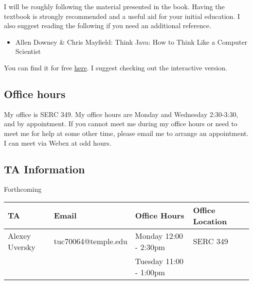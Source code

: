 \documentclass[10pt, letter]{article}
\begin{document}
I will be roughly following the material presented in the book.
Having the textbook is  strongly recommended and a useful aid for your initial education.
I also suggest reading the following if you need an additional reference.

\begin{itemize}
	\item Allen Downey \& Chris Mayfield: Think Java: How to Think Like a Computer Scientist
\end{itemize}

You can find it for free \href{http://greenteapress.com/wp/think-java/}{here}.   I suggest checking out the interactive version.

\subsection*{Office hours}
My office is SERC 349.
My office hours are Monday and Wednesday 2:30-3:30, and by appointment.
If you cannot meet me during my office hours or need to meet me for help at some other time, please email me to arrange an appointment. 
I can meet via Webex at odd hours.


\subsection*{TA Information}
Forthcoming

{\footnotesize
	\begin{tabular}{l l l l l}
		TA & Email &Office Hours & Office Location \\ \hline

		Alexey Uversky &tuc70064@temple.edu& Monday 12:00 - 2:30pm﻿ & SERC 349 \\
		﻿﻿
		 & &Tuesday 11:00 - 1:00pm & \\
	\end{tabular}
}






\end{document}
